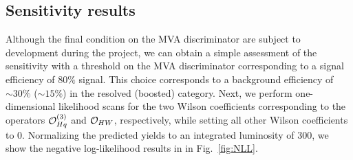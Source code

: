 \documentclass[a4paper,11pt]{article}
\begin{document}
\subsection{Sensitivity results}

Although the final condition on the MVA discriminator are subject to development during the project, 
we can obtain a simple assessment of the sensitivity with a threshold on the MVA discriminator corresponding to a signal efficiency of $80\%$ signal.
This choice corresponds to a background efficiency of $\sim 30\%$ ($\sim 15\%$) in the resolved (boosted) category.
Next, we perform one-dimensional likelihood scans for the two Wilson coefficients corresponding to the operators ${\cal O}^{(3)}_{Hq}$ and ${\cal O}_{HW}$, respectively, while setting all other Wilson coefficients to $0$. 
Normalizing the predicted yields to an integrated luminosity of 300\fbinv, we show the negative log-likelihood results in in Fig.~\ref{fig:NLL}. %
\end{document}
